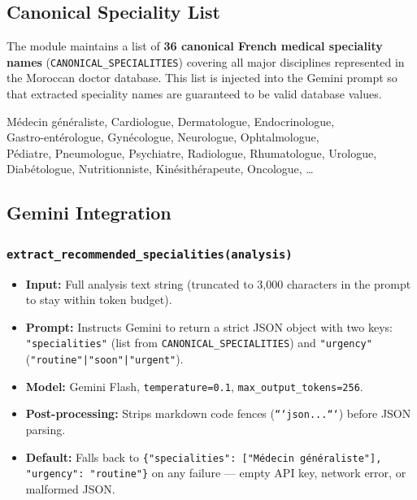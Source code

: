 \documentclass[12pt, a4paper]{article}
\newcommand{\func}[1]{\texttt{\color{danger}#1}}
\begin{document}
\subsection{Canonical Speciality List}

The module maintains a list of \textbf{36 canonical French medical
speciality names} (\texttt{CANONICAL\_SPECIALITIES}) covering all major
disciplines represented in the Moroccan doctor database. This list is
injected into the Gemini prompt so that extracted speciality names are
guaranteed to be valid database values.

\begin{infobox}[title={Sample Canonical Specialities (subset)}]
  Médecin généraliste, Cardiologue, Dermatologue, Endocrinologue,\\
  Gastro-entérologue, Gynécologue, Neurologue, Ophtalmologue,\\
  Pédiatre, Pneumologue, Psychiatre, Radiologue, Rhumatologue, Urologue,\\
  Diabétologue, Nutritionniste, Kinésithérapeute, Oncologue, \ldots
\end{infobox}

\subsection{Gemini Integration}

\subsubsection{\func{extract\_recommended\_specialities(analysis)}}

\begin{itemize}[leftmargin=*, itemsep=3pt]
  \item \textbf{Input:} Full analysis text string (truncated to 3,000
        characters in the prompt to stay within token budget).
  \item \textbf{Prompt:} Instructs Gemini to return a strict JSON object
        with two keys: \texttt{"specialities"} (list from
        \texttt{CANONICAL\_SPECIALITIES}) and \texttt{"urgency"}
        (\texttt{"routine"|"soon"|"urgent"}).
  \item \textbf{Model:} Gemini Flash, \texttt{temperature=0.1},
        \texttt{max\_output\_tokens=256}.
  \item \textbf{Post-processing:} Strips markdown code fences
        (\texttt{```json...```}) before JSON parsing.
  \item \textbf{Default:} Falls back to
        \texttt{\{"specialities": ["Médecin généraliste"], "urgency": "routine"\}}
        on any failure — empty API key, network error, or malformed JSON.
\end{itemize}
\end{document}
